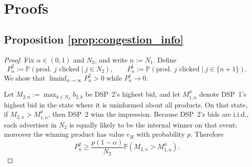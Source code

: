 \documentclass[11pt]{article}
\theoremstyle{plain}
\theoremstyle{definition}
\theoremstyle{plain}
\theoremstyle{plain}
\theoremstyle{plain}
\theoremstyle{plain}
\numberwithin{equation}{section}
\begin{document}
\fi

\section{Proofs}\label{sect:proofs}
\subsection*{Proposition \ref{prop:congestion_info}}
\begin{proof}
Fix $\alpha \in (0,1)$ and $N_2$, and write $n := N_1$. Define
\begin{equation*}
    P_n^{2} := \mathbb{P}(\text{prod.\ } j \text{ clicked} \mid j \in N_2), \qquad
    P_n^{1} := \mathbb{P}(\text{prod.\ } j \text{ clicked} \mid j \in \{n+1\}).
\end{equation*}
We show that $\liminf_{n\to\infty} P_n^{2} > 0$ while $P_n^{1} \to 0$.

\vspace{2mm}

\noindent Let $M_{2,n} := \max_{k \in N_2} b_{2,k}$ be DSP~2's highest bid, and let $M_{1,n}^{\mu}$ denote DSP~1's highest bid in the state where it is uninformed about all products. On that state, if $M_{2,n} > M_{1,n}^{\mu}$, then DSP~2 wins the impression. Because DSP~2's bids are i.i.d., each advertiser in $N_2$ is equally likely to be the internal winner on that event; moreover the winning product has value $v_H$ with probability $p$. Therefore
\begin{equation}\label{eq:stay-lower-bound}
    P_n^{2} \geq \frac{p(1-\alpha)}{N_2} \mathbb{P}(M_{2,n} > M_{1,n}^{\mu}).
\end{equation}


\end{proof}
\end{document}
